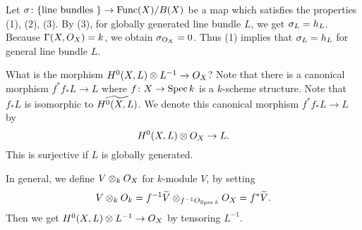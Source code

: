 \begin{rem}
  Let ${\sigma} \colon \{ \text{line bundles }\} \to \operatorname{Func}(X)/B(X)$ be a map which satisfies the properties (1), (2), (3). By (3), for globally generated line bundle $L$, we get ${\sigma}_L = h_L$. Because ${\Gamma}(X,O_X) = k$, we obtain ${\sigma}_{O_X} = 0$. Thus (1) implies that ${\sigma}_L = h_L$ for general line bundle $L$.
\end{rem}


\begin{rem}
  What is the morphism $H^0(X,L) \otimes L^{-1} \to O_X$? Note that there is a canonical morphism $f^* f_* L \to L$ where $f \colon X \to \operatorname{Spec} k$ is a $k$-scheme structure. Note that $f_* L$ is isomorphic to $\widetilde{H^0(X,L)}$. We denote this canonical morphism $f^* f_* L \to L$ by
  \[
  H^0(X,L) \otimes O_X \to L.
  \]
  This is surjective if $L$ is globally generated.

  In general, we define $V \otimes_k O_X$ for $k$-module $V$, by setting
  \[
  V \otimes_k O_k = f^{-1} \widetilde{V} \otimes_{f^{-1}O_{\operatorname{Spec} k}} O_X = f^* \widetilde{V}.
  \]
Then we get $H^0(X,L) \otimes L^{-1} \to O_X$ by tensoring $L^{-1}$.
\end{rem}


